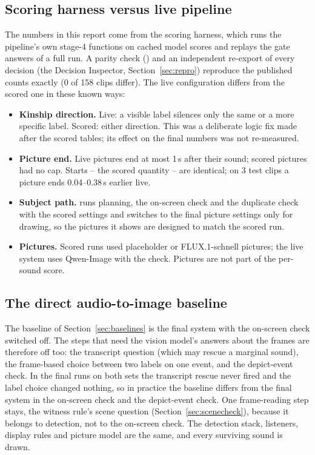 \subsection{Scoring harness versus live pipeline}\label{sec:parity}
The numbers in this report come from the scoring harness, which runs the pipeline's own stage-4 functions on cached
model scores and replays the gate answers of a full run. A parity check () and an
independent re-export of every decision (the Decision Inspector, Section~\ref{sec:repro}) reproduce the published
counts exactly (0 of 158 clips differ). The live configuration  differs from the scored one in
these known ways:
\begin{itemize}
  \item \textbf{Kinship direction.} Live: a visible label silences only the same or a more specific label. Scored:
        either direction. This was a deliberate logic fix made after the scored tables; its effect on the final
        numbers was not re-measured.
  \item \textbf{Picture end.} Live pictures end at most 1\,s after their sound; scored pictures had no cap. Starts --
        the scored quantity -- are identical; on 3 test clips a picture ends 0.04--0.38\,s earlier live.
  \item \textbf{Subject path.}  runs planning, the on-screen check and the duplicate check with the
        scored settings and switches to the final picture settings only for drawing, so the pictures it shows are
        designed to match the scored run.
  \item \textbf{Pictures.} Scored runs used placeholder or FLUX.1-schnell pictures; the live system uses Qwen-Image
        with the check. Pictures are not part of the per-sound score.
\end{itemize}

\subsection{The direct audio-to-image baseline}\label{sec:baselinedetail}
The baseline of Section~\ref{sec:baselines} is the final system with the on-screen check switched off. The steps
that need the vision model's answers about the frames are therefore off too: the transcript question (which may rescue
a marginal sound), the frame-based choice between two labels on one event, and the depict-event check. In the final
runs on both sets the transcript rescue never fired and the label choice changed nothing, so in practice the baseline
differs from the final system in the on-screen check and the depict-event check. One frame-reading step stays, the
witness rule's scene question (Section~\ref{sec:scenecheck}), because it belongs to detection, not to the on-screen
check. The detection stack, listeners, display rules and picture model are the same, and every surviving sound is
drawn.

